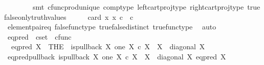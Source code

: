 \begin{isabellebody}
\ \ \ \ \ \ \ \ smt\ cfunc{\isacharunderscore}{\kern0pt}prod{\isacharunderscore}{\kern0pt}unique\ comp{\isacharunderscore}{\kern0pt}type\ left{\isacharunderscore}{\kern0pt}cart{\isacharunderscore}{\kern0pt}proj{\isacharunderscore}{\kern0pt}type\ right{\isacharunderscore}{\kern0pt}cart{\isacharunderscore}{\kern0pt}proj{\isacharunderscore}{\kern0pt}type\ true{\isacharunderscore}{\kern0pt}false{\isacharunderscore}{\kern0pt}only{\isacharunderscore}{\kern0pt}truth{\isacharunderscore}{\kern0pt}values{\isacharparenright}{\kern0pt}\isanewline
\ \ \isamarkupfalse%
\ \isamarkupfalse%
\ {\isachardoublequoteopen}card\ {\isacharbraceleft}{\kern0pt}x{\isachardot}{\kern0pt}\ x\ {\isasymin}\isactrlsub c\ {\isasymOmega}\ {\isasymtimes}\isactrlsub c\ {\isasymOmega}{\isacharbraceright}{\kern0pt}\ {\isacharequal}{\kern0pt}\ {}{\isachardoublequoteclose}\isanewline
\ \ \ \ \isamarkupfalse%
\ element{\isacharunderscore}{\kern0pt}pair{\isacharunderscore}{\kern0pt}eq\ false{\isacharunderscore}{\kern0pt}func{\isacharunderscore}{\kern0pt}type\ true{\isacharunderscore}{\kern0pt}false{\isacharunderscore}{\kern0pt}distinct\ true{\isacharunderscore}{\kern0pt}func{\isacharunderscore}{\kern0pt}type\ \isamarkupfalse%
\ auto\isanewline
{}\isamarkupfalse%
%
\endisatagproof
{\isafoldproof}%
%
\isadelimproof
%
\endisadelimproof
%
\isadelimdocument
%
\endisadelimdocument
%
\isatagdocument
%
\isamarkuptrue%
%
\endisatagdocument
{\isafolddocument}%
%
\isadelimdocument
%
\endisadelimdocument
{}\isamarkupfalse%
\ eq{\isacharunderscore}{\kern0pt}pred\ {\isacharcolon}{\kern0pt}{\isacharcolon}{\kern0pt}\ {\isachardoublequoteopen}cset\ {\isasymRightarrow}\ cfunc{\isachardoublequoteclose}\ \isanewline
\ \ {\isachardoublequoteopen}eq{\isacharunderscore}{\kern0pt}pred\ X\ {\isacharequal}{\kern0pt}\ {\isacharparenleft}{\kern0pt}THE\ {\isasymchi}{\isachardot}{\kern0pt}\ is{\isacharunderscore}{\kern0pt}pullback\ X\ one\ {\isacharparenleft}{\kern0pt}X\ {\isasymtimes}\isactrlsub c\ X{\isacharparenright}{\kern0pt}\ {\isasymOmega}\ {\isacharparenleft}{\kern0pt}{\isasymbeta}\isactrlbsub X\isactrlesub {\isacharparenright}{\kern0pt}\ {\isasymt}\ {\isacharparenleft}{\kern0pt}diagonal\ X{\isacharparenright}{\kern0pt}\ {\isasymchi}{\isacharparenright}{\kern0pt}{\isachardoublequoteclose}\isanewline
\isanewline
{}\isamarkupfalse%
\ eq{\isacharunderscore}{\kern0pt}pred{\isacharunderscore}{\kern0pt}pullback{\isacharcolon}{\kern0pt}\ {\isachardoublequoteopen}is{\isacharunderscore}{\kern0pt}pullback\ X\ one\ {\isacharparenleft}{\kern0pt}X\ {\isasymtimes}\isactrlsub c\ X{\isacharparenright}{\kern0pt}\ {\isasymOmega}\ {\isacharparenleft}{\kern0pt}{\isasymbeta}\isactrlbsub X\isactrlesub {\isacharparenright}{\kern0pt}\ {\isasymt}\ {\isacharparenleft}{\kern0pt}diagonal\ X{\isacharparenright}{\kern0pt}\ {\isacharparenleft}{\kern0pt}eq{\isacharunderscore}{\kern0pt}pred\ X{\isacharparenright}{\kern0pt}{\isachardoublequoteclose}\isanewline

\end{isabellebody}
